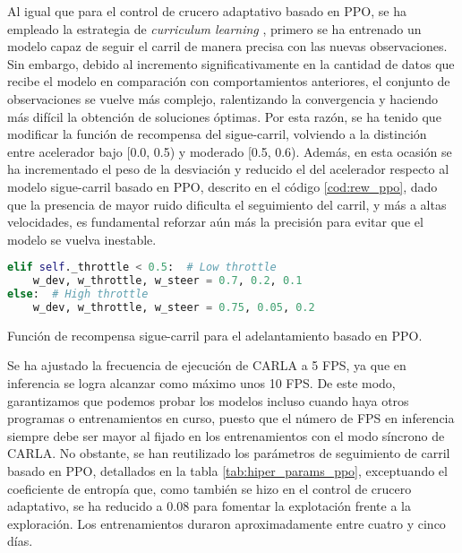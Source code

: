 Al igual que para el control de crucero adaptativo basado en \ac{PPO}, se ha empleado la estrategia de \textit{curriculum learning} \cite{curriculum-learning}, primero se ha entrenado un modelo capaz de seguir el carril de manera precisa con las nuevas observaciones. Sin embargo, debido al incremento significativamente en la cantidad de datos que recibe el modelo en comparación con comportamientos anteriores, el conjunto de observaciones se vuelve más complejo, ralentizando la convergencia y haciendo más difícil la obtención de soluciones óptimas. Por esta razón, se ha tenido que modificar la función de recompensa del sigue-carril, volviendo a la distinción entre acelerador bajo [0.0, 0.5) y moderado [0.5, 0.6). Además, en esta ocasión se ha incrementado el peso de la desviación y reducido el del acelerador respecto al modelo sigue-carril basado en \ac{PPO}, descrito en el código \ref{cod:rew_ppo}, dado que la presencia de mayor ruido dificulta el seguimiento del carril, y más a altas velocidades, es fundamental reforzar aún más la precisión para evitar que el modelo se vuelva inestable.

\begin{code}[h]
\begin{lstlisting}[language=Python]
elif self._throttle < 0.5:  # Low throttle
    w_dev, w_throttle, w_steer = 0.7, 0.2, 0.1
else:  # High throttle
    w_dev, w_throttle, w_steer = 0.75, 0.05, 0.2
\end{lstlisting}
\caption[Función de recompensa sigue-carril para el adelantamiento basado en \ac{PPO}]{Función de recompensa sigue-carril para el adelantamiento basado en \ac{PPO}.}
\label{cod:rew_ppo_lane_overtaken}
\end{code}

\newpage

Se ha ajustado la frecuencia de ejecución de CARLA a 5 \ac{FPS}, ya que en inferencia se logra alcanzar como máximo unos 10 \ac{FPS}. De este modo, garantizamos que podemos probar los modelos incluso cuando haya otros programas o entrenamientos en curso, puesto que el número de \ac{FPS} en inferencia siempre debe ser mayor al fijado en los entrenamientos con el modo síncrono de CARLA. No obstante, se han reutilizado los parámetros de seguimiento de carril basado en \ac{PPO}, detallados en la tabla \ref{tab:hiper_params_ppo}, exceptuando el coeficiente de entropía que, como también se hizo en el control de crucero adaptativo, se ha reducido a 0.08 para fomentar la explotación frente a la exploración. Los entrenamientos duraron aproximadamente entre cuatro y cinco días.

